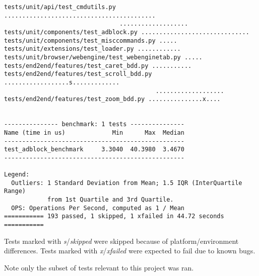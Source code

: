 \begin{appendices}
\begin{verbatim}
tests/unit/api/test_cmdutils.py ..........................................
                                ...................
tests/unit/components/test_adblock.py ..............................
tests/unit/components/test_misccommands.py .....
tests/unit/extensions/test_loader.py ............
tests/unit/browser/webengine/test_webenginetab.py .....
tests/end2end/features/test_caret_bdd.py ...........
tests/end2end/features/test_scroll_bdd.py ..................s.............
                                          ...................
tests/end2end/features/test_zoom_bdd.py ...............x....


--------------- benchmark: 1 tests ---------------
Name (time in us)             Min      Max  Median
--------------------------------------------------
test_adblock_benchmark     3.3040  40.3980  3.4670
--------------------------------------------------

Legend:
  Outliers: 1 Standard Deviation from Mean; 1.5 IQR (InterQuartile Range)
            from 1st Quartile and 3rd Quartile.
  OPS: Operations Per Second, computed as 1 / Mean
=========== 193 passed, 1 skipped, 1 xfailed in 44.72 seconds ===========
\end{verbatim}

Tests marked with \emph{s}/\emph{skipped} were skipped because of
platform/environment differences. Tests marked with \emph{x}/\emph{xfailed} were
expected to fail due to known bugs.

Note only the subset of tests relevant to this project was ran.

\renewcommand{\bibname}{\chapter{Literature and Sources}\vspace{-1em}}
{\let\clearpage\relax\printbibliography}
\end{appendices}
